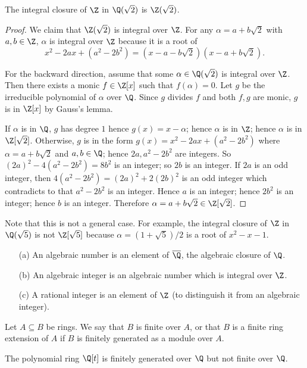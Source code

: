 \begin{proposition}
    The integral closure of $\Z$ in $\Q(\sqrt{2})$ is $\Z(\sqrt{2})$.
\end{proposition}
\begin{proof}
    We claim that $\Z(\sqrt{2})$ is integral over $\Z$. For any $\alpha = a+b\sqrt{2}$ with $a, b\in \Z$, $\alpha$ is integral over $\Z$ because it is a root of \[x^2-2ax+(a^2-2b^2) = (x-a-b\sqrt{2})(x-a+b\sqrt{2}).\]

    For the backward direction, assume that some $\alpha \in \Q(\sqrt{2})$ is integral over $\Z$. Then there exists a monic $f \in \Z[x]$ such that $f(\alpha) = 0$. Let $g$ be the irreducible polynomial of $\alpha$ over $\Q$. Since $g$ divides $f$ and both $f, g$ are monic, $g$ is in $\Z[x]$ by Gauss's lemma.

    If $\alpha$ is in $\Q$, $g$ has degree $1$ hence $g(x) = x-\alpha$; hence $\alpha$ is in $\Z$; hence $\alpha$ is in $\Z[\sqrt{2}]$. Otherwise, $g$ is in the form $g(x) = x^2 -2ax+(a^2-2b^2)$ where $\alpha = a+b\sqrt{2}$ and $a,b \in \Q$; hence $2a, a^2-2b^2$ are integers. So $(2a)^2-4(a^2-2b^2) = 8b^2$ is an integer; so $2b$ is an integer. If $2a$ is an odd integer, then $4(a^2-2b^2) = (2a)^2 + 2(2b)^2$ is an odd integer which contradicts to that $a^2-2b^2$ is an integer. Hence $a$ is an integer; hence $2b^2$ is an integer; hence $b$ is an integer. Therefore $\alpha = a+b\sqrt{2} \in\Z[\sqrt{2}]$.
\end{proof}

Note that this is not a general case. For example, the integral closure of $\Z$ in $\Q(\sqrt{5})$ is not $\Z[\sqrt{5}]$ because $\alpha = (1+\sqrt{5})/2$ is a root of $x^2-x-1$.

\begin{definition}\noindent
    \begin{itemize}
        \item[(a)] An algebraic number is an element of $\overline{\Q}$, the algebraic closure of $\Q$.
        \item[(b)] An algebraic integer is an algebraic number which is integral over $\Z$.
        \item[(c)] A rational integer is an element of $\Z$ (to distinguish it from an algebraic integer).
    \end{itemize}
\end{definition}

\begin{definition}
    Let $A \subseteq B$ be rings. We say that $B$ is finite over $A$, or that $B$ is a finite ring extension of $A$ if $B$ is finitely generated as a module over $A$.
\end{definition}

\begin{example}
    The polynomial ring $\Q[t]$ is finitely generated over $\Q$ but not finite over $\Q$.
\end{example}
\clearpage